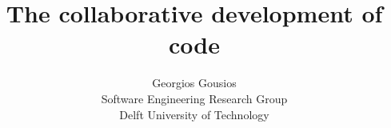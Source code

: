 \documentclass[10pt]{article}
\title{The collaborative development of code}
\author{Georgios Gousios\\
Software Engineering Research Group\\
Delft University of Technology
}
\date{}
\begin{document}
\maketitle
\begin{abstract}
\end{abstract}


  
\end{document}

